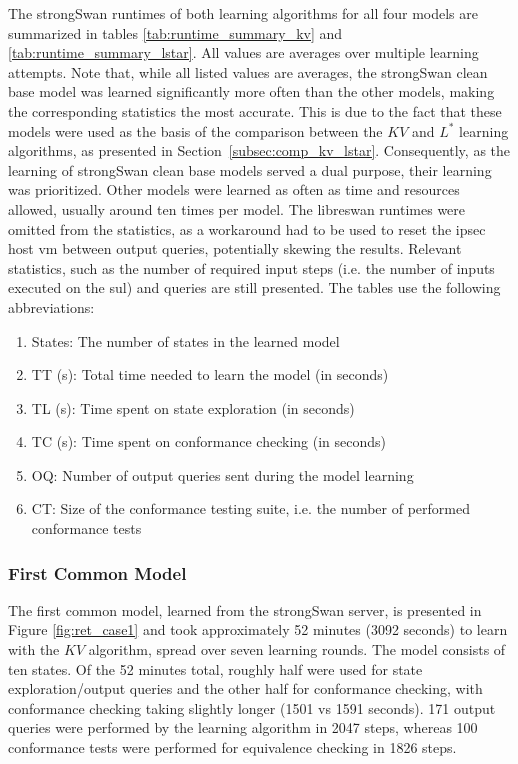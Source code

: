 The strongSwan runtimes of both learning algorithms for all four models are summarized in tables \ref{tab:runtime_summary_kv} and \ref{tab:runtime_summary_lstar}. All values are averages over multiple learning attempts. Note that, while all listed values are averages, the strongSwan clean base model was learned significantly more often than the other models, making the corresponding statistics the most accurate. This is due to the fact that these models were used as the basis of the comparison between the $KV$ and $L^*$ learning algorithms, as presented in Section~\ref{subsec:comp_kv_lstar}. Consequently, as the learning of strongSwan clean base models served a dual purpose, their learning was prioritized. Other models were learned as often as time and resources allowed, usually around ten times per model. The libreswan runtimes were omitted from the statistics, as a workaround had to be used to reset the \ac{ipsec} host \ac{vm} between output queries, potentially skewing the results. Relevant statistics, such as the number of required input steps (i.e. the number of inputs executed on the \ac{sul}) and queries are still presented. The tables use the following abbreviations:

\begin{enumerate}
	\item States: The number of states in the learned model
	\item TT (s): Total time needed to learn the model (in seconds)
	\item TL (s): Time spent on state exploration (in seconds)
	\item TC (s): Time spent on conformance checking (in seconds)
	\item OQ: Number of output queries sent during the model learning
	\item CT: Size of the conformance testing suite, i.e. the number of performed conformance tests
\end{enumerate}
\newpage
 

\subsubsection*{First Common Model}

The first common model, learned from the strongSwan server, is presented in Figure \ref{fig:ret_case1} and took approximately 52 minutes (3092 seconds) to learn with the $KV$ algorithm, spread over seven learning rounds. The model consists of ten states. Of the 52 minutes total, roughly half were used for state exploration/output queries and the other half for conformance checking, with conformance checking taking slightly longer (1501 vs 1591 seconds). 171 output queries were performed by the learning algorithm in 2047 steps, whereas 100 conformance tests were performed for equivalence checking in 1826 steps.

